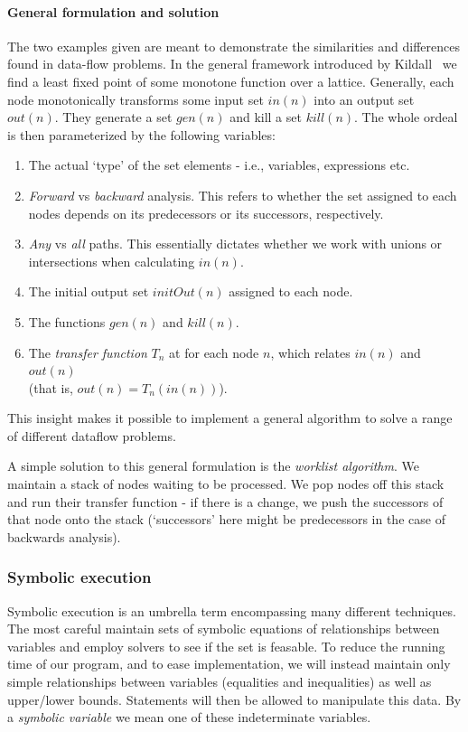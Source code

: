 \documentclass[12pt,a4paper]{article}
\begin{document}
\paragraph{General formulation and solution}\label{par:general}
The two examples given are meant to demonstrate the similarities and differences found in data-flow problems. In the general framework introduced by Kildall~\citep{kildall} we find a least fixed point of some monotone function over a lattice.
Generally, each node monotonically transforms some input set $in(n)$ into an output set $out(n)$. They generate a set $gen(n)$ and kill a set $kill(n)$. The whole ordeal is then 
parameterized by the following variables:
\begin{enumerate}
  \item The actual `type' of the set elements - i.e., variables, expressions etc.
  \item \textit{Forward} vs \textit{backward} analysis. This refers to whether the set assigned to each nodes depends on its predecessors or its successors, respectively.
  \item \textit{Any} vs \textit{all} paths. This essentially dictates whether we work with unions or intersections when calculating $in(n)$.
  \item The initial output set $initOut(n)$ assigned to each node.
  \item The functions $gen(n)$ and $kill(n)$.
  \item The \textit{transfer function} $T_n$ at for each node $n$, which relates $in(n)$ and $out(n)$ \\(that is, $out(n) = T_n(in(n))$).
\end{enumerate}
This insight makes it possible to implement a general algorithm to solve a range of different dataflow problems.\par
A simple solution to this general formulation is the \textit{worklist algorithm}. We maintain a stack of nodes waiting to be processed. We pop nodes off this stack
and run their transfer function - if there is a change, we push the successors of that node onto the stack (`successors' here might be predecessors in the case of
backwards analysis).

\subsubsection{Symbolic execution}
Symbolic execution is an umbrella term encompassing many different techniques. The most careful maintain sets of symbolic equations of relationships between variables and employ solvers to see if the set is feasable. To reduce the running time of our program, and to ease implementation, we will instead maintain only simple relationships between variables (equalities and inequalities) as well as upper/lower bounds. Statements will then be allowed to manipulate this data. By a \textit{symbolic variable} we mean one of these indeterminate variables.
\end{document}
